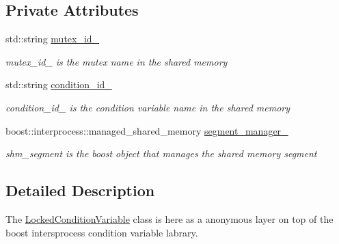 \subsection*{Private Attributes}
\begin{DoxyCompactItemize}
\item 
\mbox{\label{classshared__memory_1_1LockedConditionVariable_a07d7d718e33cc2e833cf9bb22fe8fada}} 
std\+::string \hyperlink{classshared__memory_1_1LockedConditionVariable_a07d7d718e33cc2e833cf9bb22fe8fada}{mutex\+\_\+id\+\_\+}
\begin{DoxyCompactList}\small\item\em mutex\+\_\+id\+\_\+ is the mutex name in the shared memory \end{DoxyCompactList}\item 
\mbox{\label{classshared__memory_1_1LockedConditionVariable_a7cf01915f9d1a8795f4e69345cd1e1e4}} 
std\+::string \hyperlink{classshared__memory_1_1LockedConditionVariable_a7cf01915f9d1a8795f4e69345cd1e1e4}{condition\+\_\+id\+\_\+}
\begin{DoxyCompactList}\small\item\em condition\+\_\+id\+\_\+ is the condition variable name in the shared memory \end{DoxyCompactList}\item 
\mbox{\label{classshared__memory_1_1LockedConditionVariable_ae6a197846be3bd4ccf4899754778f16b}} 
boost\+::interprocess\+::managed\+\_\+shared\+\_\+memory \hyperlink{classshared__memory_1_1LockedConditionVariable_ae6a197846be3bd4ccf4899754778f16b}{segment\+\_\+manager\+\_\+}
\begin{DoxyCompactList}\small\item\em shm\+\_\+segment is the boost object that manages the shared memory segment \end{DoxyCompactList}\end{DoxyCompactItemize}


\subsection{Detailed Description}
The \hyperlink{classshared__memory_1_1LockedConditionVariable}{Locked\+Condition\+Variable} class is here as a anonymous layer on top of the boost intersprocess condition variable labrary. 

